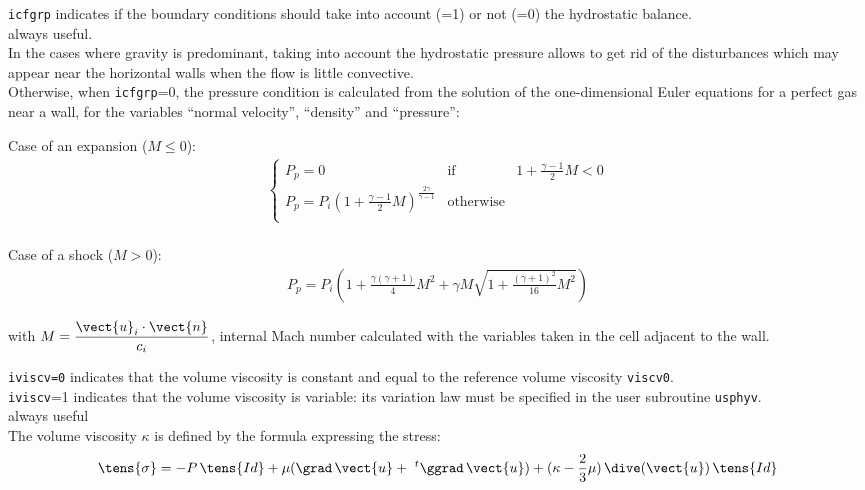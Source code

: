 {\texttt{icfgrp} indicates if the boundary
conditions should take into account (=1) or not (=0) the hydrostatic balance.\\
always useful.\\
In the cases where gravity is predominant, taking into account the hydrostatic
pressure allows to get rid of the disturbances which may appear near the
horizontal walls when the flow is little convective.\\
%
Otherwise, when \texttt{icfgrp}=0, the pressure condition is calculated
from the solution of the one-dimensional Euler equations for a perfect
gas near a wall, for the variables ``normal velocity'', ``density'' and
``pressure'':
\vspace{0.2cm}
\begin{list}{}{}
\item Case of an expansion ($M \leqslant 0$):\\
$$
\begin{array}{l}
\left\{\begin{array}{lll}
P_p=0 & \text{if} & 1 + \displaystyle\frac{\gamma-1}{2}M<0\\
P_p = P_i \left(1 + \displaystyle\frac{\gamma-1}{2}M\right)
^{\frac{2\gamma}{\gamma-1}} & \text{otherwise}\\
\end{array}\right.\\
\end{array}
$$

\item Case of a shock ($M > 0$):\\
$$
\begin{array}{l}
P_p = P_i \left(1 + \displaystyle\frac{\gamma(\gamma+1)}{4}M^2
+\gamma M \displaystyle\sqrt{1+\displaystyle\frac{(\gamma+1)^2}{16}M^2}\right)
\end{array}
$$

with $M = \displaystyle\frac{\vect{u}_i \cdot \vect{n}}{c_i}$, internal
      Mach number calculated with the variables taken in the cell
      adjacent to the wall.\\

\end{list}
}

{\texttt{iviscv=0} indicates that
the volume viscosity is constant and equal to the reference volume viscosity
\texttt{viscv0}.\\
\texttt{iviscv}=1 indicates that the volume viscosity is variable: its
variation law must be specified in the user subroutine \texttt{usphyv}.\\
always useful\\
The volume viscosity $\kappa$ is defined by the formula expressing the stress:
\begin{equation}
   \tens{\sigma} = -P\,\tens{Id} + \mu (\grad\,\vect{u} +  \ ^{t}\ggrad\,\vect{u})
           +(\kappa-\frac{2}{3}\mu)\,\dive(\vect{u})\,\tens{Id}
\end{equation}
}

